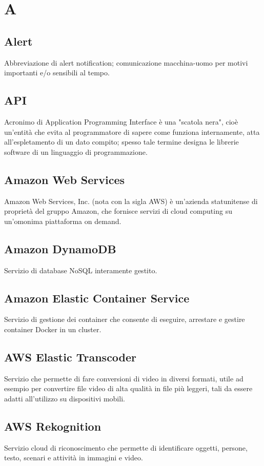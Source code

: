 \section*{A}
\subsection*{Alert}
Abbreviazione di alert notification; comunicazione macchina-uomo per motivi importanti e/o sensibili al tempo.

\subsection*{API}
Acronimo di Application Programming Interface è una "scatola nera", cioè un'entità che evita al programmatore di sapere come funziona internamente, atta all'espletamento di un dato compito; spesso tale termine designa le librerie software di un linguaggio di programmazione.

\subsection*{Amazon Web Services}
Amazon Web Services, Inc. (nota con la sigla AWS) è un'azienda statunitense di proprietà del gruppo Amazon, che fornisce servizi di cloud computing su un'omonima piattaforma on demand.

\subsection*{Amazon DynamoDB}
Servizio di database NoSQL interamente gestito.

\subsection*{Amazon Elastic Container Service}
Servizio di gestione dei container che consente di eseguire, arrestare e gestire container Docker in un cluster.

\subsection*{AWS Elastic Transcoder}
Servizio che permette di fare conversioni di video in diversi formati, utile ad esempio per convertire file video di alta qualità in file più leggeri, tali da essere adatti all'utilizzo su dispositivi mobili.

\subsection*{AWS Rekognition}
Servizio cloud di riconoscimento che permette di identificare oggetti, persone, testo, scenari e attività in immagini e video. 

